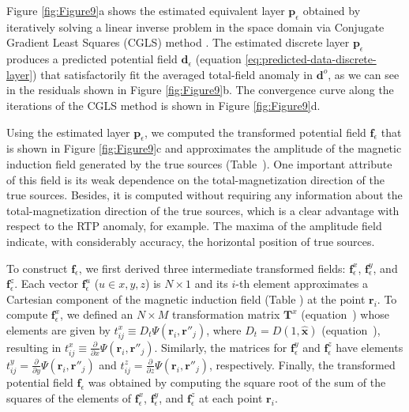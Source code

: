 Figure \ref{fig:Figure9}a shows the estimated equivalent layer $\mathbf{p}_{\epsilon}$ 
obtained by iteratively solving a linear inverse problem in the space domain via 
Conjugate Gradient Least Squares (CGLS) method \citep[][ p. 166]{aster_etal2019}. 
The estimated discrete layer $\mathbf{p}_{\epsilon}$ produces a predicted potential 
field $\mathbf{d}_{\epsilon}$ (equation \ref{eq:predicted-data-discrete-layer}) that 
satisfactorily fit the averaged total-field anomaly in $\mathbf{d}^{o}$, as we can see 
in the residuals shown in Figure \ref{fig:Figure9}b. The convergence curve along the 
iterations of the CGLS method is shown in Figure \ref{fig:Figure9}d.

Using the estimated layer $\mathbf{p}_{\epsilon}$, we computed the transformed potential field 
$\mathbf{f}_{\epsilon}$ that is shown in Figure \ref{fig:Figure9}c and 
approximates the amplitude of the magnetic 
induction field generated by the true sources (Table~). 
One important attribute of this field is its weak 
dependence on the total-magnetization direction of the true sources. 
Besides, it is computed without requiring any information about the total-magnetization
direction of the true sources, which is a clear advantage with respect to the 
RTP anomaly, for example. 
The maxima of the amplitude field indicate, with considerably accuracy, the horizontal
position of true sources.

To construct $\mathbf{f}_{\epsilon}$, we first derived three intermediate transformed fields: 
$\mathbf{f}^{x}_{\epsilon}$, $\mathbf{f}^{y}_{\epsilon}$, and $\mathbf{f}^{z}_{\epsilon}$. 
Each vector $\mathbf{f}^{u}_{\epsilon}$ 
($u \in {x, y, z}$) is $N \times 1$ and its $i$-th element approximates a Cartesian 
component of the magnetic induction field (Table ) at the point 
$\mathbf{r}_{i}$.
To compute $\mathbf{f}^{x}_{\epsilon}$, we defined an $N \times M$ transformation 
matrix $\mathbf{T}^{x}$ (equation~) whose 
elements are given by 
$t^{x}_{ij} \equiv D_{t} \Psi(\mathbf{r}_{i}, \mathbf{r}''_{j})$, 
where $D_{t} = D(1,\hat{\mathbf{x}})$ 
(equation~), resulting in
$t^{x}_{ij} \equiv \frac{\partial}{\partial x} \Psi(\mathbf{r}_{i}, \mathbf{r}''_{j})$. 
Similarly, the matrices for $\mathbf{f}^{y}_{\epsilon}$ and $\mathbf{f}^{z}_{\epsilon}$ have 
elements $t^{y}_{ij} = \frac{\partial}{\partial y} \Psi(\mathbf{r}_{i}, \mathbf{r}''_{j})$ and 
$t^{z}_{ij} = \frac{\partial}{\partial z} \Psi(\mathbf{r}_{i}, \mathbf{r}''_{j})$, 
respectively.
Finally, the transformed potential field $\mathbf{f}_{\epsilon}$ was obtained by computing the 
square root of the sum of the squares of the elements of $\mathbf{f}^{x}_{\epsilon}$, 
$\mathbf{f}^{y}_{\epsilon}$, and $\mathbf{f}^{z}_{\epsilon}$ at each point $\mathbf{r}_{i}$.

